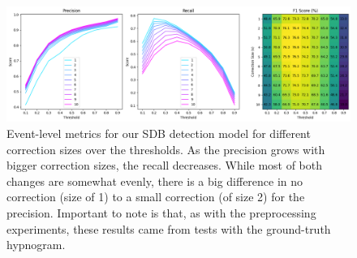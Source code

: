 \begin{figure}
    \centering
    \includegraphics[width=\textwidth]{images/CorSizeMetrics}
    \caption{Event-level metrics for our SDB detection model for different correction sizes over the thresholds. As the precision grows with bigger correction sizes, the recall decreases. While most of both changes are somewhat evenly, there is a big difference in no correction (size of 1) to a small correction (of size 2) for the precision. Important to note is that, as with the preprocessing experiments, these results came from tests with the ground-truth hypnogram.}
    \label{fig:correction-size}
\end{figure}
